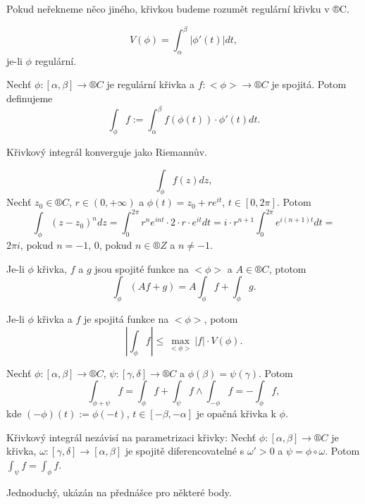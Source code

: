 \documentclass[12pt]{article}					%
\begin{document}
\begin{poznamka}[Úmluva]
	Pokud neřekneme něco jiného, křivkou budeme rozumět regulární křivku v ®C.
\end{poznamka}

\begin{definice}
	$$ V(\phi) = \int_\alpha^\beta |\phi'(t)| dt, $$
	je-li $\phi$ regulární.
\end{definice}

\begin{definice}
	Nechť $\phi: [\alpha, \beta] \rightarrow ®C$ je regulární křivka a $f: <\phi> \rightarrow ®C$ je spojitá. Potom definujeme
	$$ \int_\phi f := \int_\alpha^\beta f(\phi(t))·\phi'(t) dt. $$
\end{definice}

\begin{poznamka}
	Křivkový integrál konverguje jako Riemannův.

	$$ \int_\phi f(z) dz, $$
	Nechť $z_0 \in ®C$, $r \in (0, +∞)$ a $\phi(t) = z_0 + r e^{it}$, $t \in [0, 2\pi]$. Potom
	$$ \int_\phi (z - z_0)^n dz = \int_0^{2\pi} r^n e^{i n t}·2·r·e^{it} dt = i·r^{n+1} \int_0^{2\pi} e^{i(n + 1) t} dt = $$
	$2\pi i$, pokud $n = -1$, 0, pokud $n \in ®Z$ a $n ≠ -1$.
\end{poznamka}

\begin{tvrzeni}
	Je-li $\phi$ křivka, $f$ a $g$ jsou spojité funkce na $<\phi>$ a $A \in ®C$, ptotom
	$$ \int_\phi (Af + g) = A\int_\phi f + \int_\phi g. $$

	Je-li $\phi$ křivka a $f$ je spojitá funkce na $<\phi>$, potom
	$$ |\int_\phi f| ≤ \max_{<\phi>} |f|·V(\phi). $$

	Nechť $\phi: [\alpha, \beta] \rightarrow ®C$, $\psi: [\gamma, \delta] \rightarrow ®C$ a $\phi(\beta) = \psi(\gamma)$. Potom
	$$ \int_{\phi + \psi} f = \int_\phi f + \int_\psi f \land \int_{-\phi} f = - \int_\phi f, $$
	kde $(-\phi)(t) := \phi(-t)$, $t \in [-\beta, -\alpha]$ je opačná křivka k $\phi$.

	Křivkový integrál nezávisí na parametrizaci křivky: Nechť $\phi: [\alpha, \beta] \rightarrow ®C$ je křivka, $\omega: [\gamma, \delta] \rightarrow [\alpha, \beta]$ je spojitě diferencovatelné s $\omega' > 0$ a $\psi = \phi\circ\omega$. Potom $\int_\psi f = \int_\phi f$.

	\begin{dukazin}
		Jednoduchý, ukázán na přednášce pro některé body.
	\end{dukazin}
\end{tvrzeni}
\end{document}
